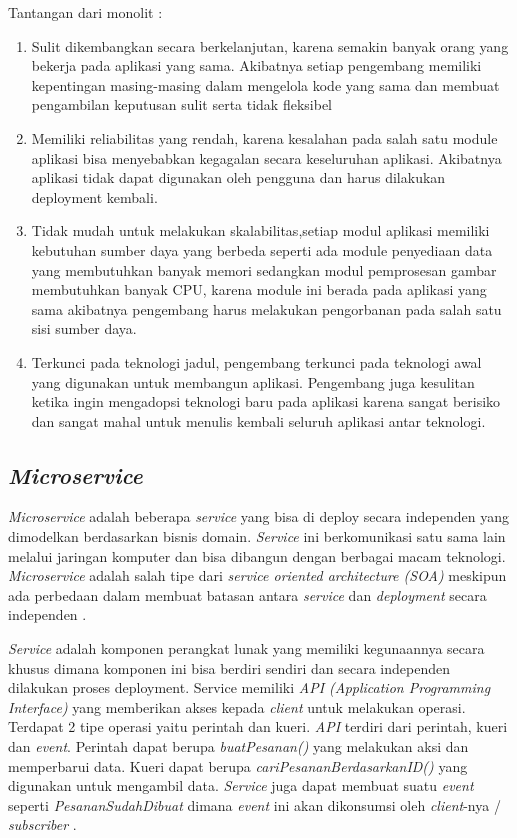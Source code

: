 Tantangan dari monolit \cite{6,8}:
\begin{enumerate}[leftmargin=1.3cm]
	\item Sulit dikembangkan secara berkelanjutan, karena semakin banyak orang yang bekerja pada aplikasi yang sama. Akibatnya setiap pengembang memiliki kepentingan masing-masing dalam mengelola kode yang sama dan membuat pengambilan keputusan sulit serta tidak fleksibel
	\item Memiliki reliabilitas yang rendah, karena kesalahan pada salah satu module aplikasi bisa menyebabkan kegagalan secara keseluruhan aplikasi. Akibatnya aplikasi tidak dapat digunakan oleh pengguna dan harus dilakukan deployment kembali.
	\item Tidak mudah untuk melakukan skalabilitas,setiap modul aplikasi memiliki kebutuhan sumber daya yang berbeda seperti ada module penyediaan data yang membutuhkan banyak memori sedangkan modul pemprosesan gambar membutuhkan banyak CPU, karena module ini berada pada aplikasi yang sama akibatnya pengembang harus melakukan pengorbanan pada salah satu sisi sumber daya.
	\item Terkunci pada teknologi jadul, pengembang terkunci pada teknologi awal yang digunakan untuk membangun aplikasi. Pengembang juga kesulitan ketika ingin mengadopsi teknologi baru pada aplikasi karena sangat berisiko dan sangat mahal untuk menulis kembali seluruh aplikasi antar teknologi.\\
\end{enumerate}	

\subsection{\textit{Microservice}}
\textit{Microservice} adalah beberapa \textit{service} yang bisa di deploy secara independen yang dimodelkan berdasarkan bisnis domain. \textit{Service} ini berkomunikasi satu sama lain melalui jaringan komputer dan bisa dibangun dengan berbagai macam teknologi. \textit{Microservice} adalah salah tipe dari \textit{service oriented architecture (SOA)} meskipun ada perbedaan dalam membuat batasan antara \textit{service} dan \textit{deployment} secara independen \cite{8}.

\textit{Service} adalah komponen perangkat lunak yang memiliki kegunaannya secara khusus dimana komponen ini bisa berdiri sendiri dan secara independen dilakukan proses deployment. Service memiliki \textit{API (Application Programming Interface)} yang memberikan akses kepada \textit{client} untuk melakukan operasi. Terdapat 2 tipe operasi yaitu perintah dan kueri.
\textit{API} terdiri dari perintah, kueri dan \textit{event}. Perintah dapat berupa \textit{buatPesanan()} yang melakukan aksi dan memperbarui data. Kueri dapat berupa \textit{cariPesananBerdasarkanID()} yang digunakan untuk mengambil data. \textit{Service} juga dapat membuat suatu \textit{event} seperti \textit{PesananSudahDibuat} dimana \textit{event} ini akan dikonsumsi oleh \textit{client}-nya / \textit{subscriber} \cite{8}.

